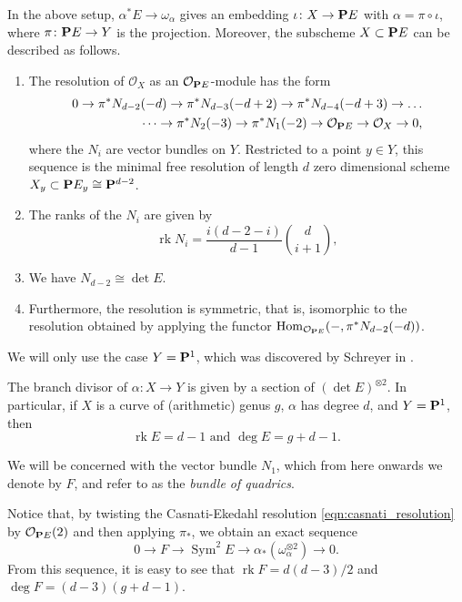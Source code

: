 \documentclass[11pt, two side, letterpaper, final]{amsart}
\renewcommand{\P}{{\bf P}}
\newcommand {\from}{\colon}
\DeclareMathOperator{\Sym}{Sym}
\DeclareMathOperator{\rk}{rk}
\DeclareMathOperator{\Hom}{Hom}
\newcommand{\cO}{\mathcal{O}}
\newcommand{\cE}{E}
\newcommand{\cN}{N}
\begin{document}
\begin{theorem}\label{thm:CE}
  \cite[Theorem~2.1]{casnati_covers_1996}
  In the above setup, $\alpha^* \cE \to \omega_\alpha$ gives an embedding $\iota \from X \to \P \cE$ with $\alpha  = \pi \circ \iota$, where $\pi \from \P \cE \to Y$ is the projection. Moreover, the subscheme $X \subset \P \cE$ can be described as follows.
\begin{enumerate}[label=(\alph*)]
\item The resolution of $\cO_X$ as an $\cO_{\P \cE}$-module has the form
\begin{equation}\label{eqn:casnati_resolution}
  \begin{split}
    0 \to \pi^* \cN_{d-2} (-d) \to \pi^* \cN_{d-3}(-d+2) \to \pi^*\cN_{d-4}(-d+3) \to \dots \\
    \dots \to \pi^*\cN_2(-3) \to \pi^*\cN_1(-2) \to \cO_{\P \cE} \to \cO_X \to 0,
  \end{split}
\end{equation}
where the $\cN_i$ are vector bundles on $Y$. Restricted to a point $y \in Y$, this sequence is the minimal free resolution of length $d$ zero dimensional scheme $X_y \subset \P \cE_y\cong \P^{d-2}$.
\item \label{thm:CE item rank} The ranks of the $\cN_i$ are given by
  \[ \rk \cN_i = \frac{i(d-2-i)}{d-1} \binom{d}{i+1},\]
\item We have $\cN_{d-2} \cong \det \cE$.
\item Furthermore, the resolution is symmetric, that is, isomorphic to the resolution obtained by applying the functor
$\Hom_{\cO_{\P \cE}}(-, \pi^* \cN_{d-2}(-d))$.
\end{enumerate}
\end{theorem}

\begin{remark}
We will only use the case $Y=\P^1$, which was discovered by  Schreyer in \cite[Corollary 4.4]{schreyer_syzygies_1986}.
\end{remark}

The branch divisor of $\alpha \from X \to Y$ is given by a section of $(\det \cE)^{\otimes 2}$. In particular, if $X$ is a curve of (arithmetic) genus $g$, $\alpha$ has degree $d$, and $Y = \P^1$, then 
\[
 \rk \cE = d-1 \text{ and } \deg \cE = g+d-1.
 \]

We will be concerned with the vector bundle $N_{1}$, which from here onwards we denote by $F$, and refer to as the \emph{bundle of quadrics}.

Notice that, by twisting the Casnati-Ekedahl resolution \eqref{eqn:casnati_resolution} by $\cO_{\P E}(2)$ and then applying $\pi_{*}$, we obtain an exact sequence 
\begin{equation}\label{Fsequence}
0 \to F \to \Sym^{2}E \to \alpha_{*}(\omega_{\alpha}^{\otimes 2}) \to 0.
\end{equation}
From this sequence, it is easy to see that $\rk F = d(d-3)/2$ and $\deg F = (d-3)(g+d-1)$.
\end{document}
